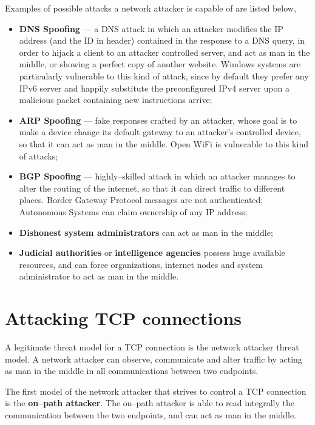 \documentclass[10pt]{extreport}
\begin{document}
Examples of possible attacks a network attacker is capable of are listed below,
\begin{itemize}
    \item \textbf{DNS Spoofing} --- a DNS attack in which an attacker modifies
        the IP address (and the ID in header) contained in the response to a
        DNS query, in order to hijack a client to an attacker controlled
        server, and act as man in the middle, or showing a perfect copy of
        another website. Windows systems are particularly vulnerable to this
        kind of attack, since by default they prefer any IPv6 server and
        happily substitute the preconfigured IPv4 server upon a malicious
        packet containing new instructions arrive;
    \item \textbf{ARP Spoofing} --- fake responses crafted by an attacker, whose
        goal is to make a device change its default gateway to an attacker's
        controlled device, so that it can act as man in the middle. Open WiFi
        is vulnerable to this kind of attacks;
    \item \textbf{BGP Spoofing} --- highly--skilled attack in which an attacker
        manages to alter the routing of the internet, so that it can direct
        traffic to different places. Border Gateway Protocol messages are not
        authenticated; Autonomous Systems can claim ownership of any IP
        address;
    \item \textbf{Dishonest system administrators} can act as man in the middle;
    \item \textbf{Judicial authorities} or \textbf{intelligence agencies}
        possess huge available resources, and can force organizations, internet
        nodes and system administrator to act as man in the middle.
\end{itemize}


\section{Attacking TCP connections}

A legitimate threat model for a TCP connection is the network attacker threat
model. A network attacker can observe, communicate and alter traffic by acting
as man in the middle in all communications between two endpoints.

The first model of the network attacker that strives to control a TCP connection
is the \textbf{on--path attacker}. The on--path attacker is able to read
integrally the communication between the two endpoints, and can act as man in
the middle.
\end{document}
